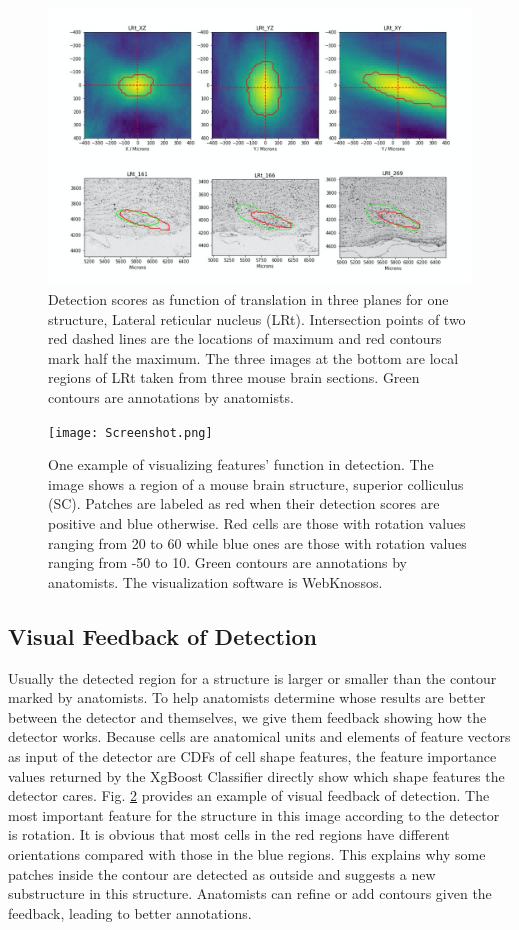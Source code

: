 \documentclass[runningheads]{llncs}
\begin{document}
\begin{figure}
\includegraphics[width=\textwidth]{Shift3D.png}
\caption{Detection scores as function of translation in three planes for one structure, Lateral reticular nucleus (LRt). Intersection points of two red dashed lines are the locations of maximum and red contours mark half the maximum. The three images at the bottom are local regions of LRt taken from three mouse brain sections. Green contours are annotations by anatomists.}
\label{3Dshift}
\end{figure}


\begin{figure}
\texttt{[image: Screenshot.png]}
\caption{One example of visualizing features' function in detection. The image shows a region of a mouse brain structure, superior colliculus (SC). Patches are labeled as red when their detection scores are positive and blue otherwise. Red cells are those with rotation values ranging from 20 to 60 while blue ones are those with rotation values ranging from -50 to 10. Green contours are annotations by anatomists. The visualization software is WebKnossos.}
\label{webknossos}
\end{figure}


\subsection{Visual Feedback of Detection}

Usually the detected region for a structure is larger or smaller than the contour marked by anatomists. To help anatomists determine whose results are better between the detector and themselves, we give them feedback showing how the detector works. Because cells are anatomical units and elements of feature vectors as input of the detector are CDFs of cell shape features, the feature importance values returned by the XgBoost Classifier directly show which shape features the detector cares. Fig. \ref{webknossos} provides an example of visual feedback of detection. The most important feature for the structure in this image according to the detector is rotation. It  is obvious that most cells in the red regions have different orientations compared with those in the blue regions. This explains why some patches inside the contour are detected as outside and suggests a new substructure in this structure. Anatomists can refine or add contours given the feedback, leading to better annotations.
\end{document}
